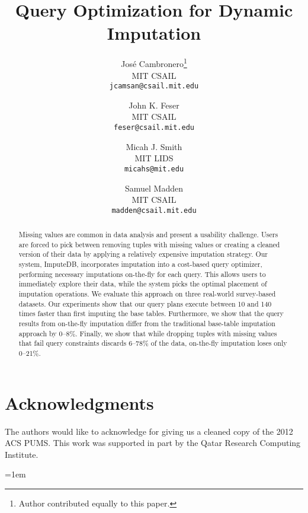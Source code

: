 \documentclass{vldb}
\title{Query Optimization for Dynamic Imputation}
\author{
  Jos\'e Cambronero\thanks{Author contributed equally to this paper.} \\
  MIT CSAIL \\
  \texttt{jcamsan@csail.mit.edu}
  \and
  John K. Feser\footnotemark[1] \\
  MIT CSAIL \\
  \texttt{feser@csail.mit.edu}
  \and
  Micah J. Smith\footnotemark[1] \\
  MIT LIDS \\
  \texttt{micahs@mit.edu}
  \and
  Samuel Madden \\
  MIT CSAIL \\
  \texttt{madden@csail.mit.edu}}
\newcommand{\ProjectName}{ImputeDB\xspace}
\newcommand{\cameraready}[1]{{\color{red}#1}}
\newcommand{\lowxalphazero}{10} %
\newcommand{\highxalphazero}{140} %
\newcommand{\lowsmapealphazero}{0} %
\newcommand{\highsmapealphazero}{8} %
\newcommand{\lowcountfractionlostalphazero}{0}
\newcommand{\highcountfractionlostalphazero}{21}
\newcommand{\lowcountfractionlostalphaone}{6}
\newcommand{\highcountfractionlostalphaone}{78}
\begin{document}
\maketitle

\begin{abstract}
  Missing values are common in data analysis and present a usability challenge.
  Users are forced to pick between removing tuples with missing values or creating a cleaned version of their data by applying a relatively expensive imputation strategy.
  Our system, \ProjectName{}, incorporates imputation into a cost-based query optimizer, performing necessary imputations on-the-fly for each query.
  This allows users to immediately explore their data, while the system picks the optimal placement of imputation operations.
  We evaluate this approach on three real-world survey-based datasets.
  Our experiments show that our query plans execute between \lowxalphazero{} and \highxalphazero{} times faster than first imputing the base tables.
  Furthermore, we show that the query results from on-the-fly imputation differ from the
  traditional base-table imputation approach by \lowsmapealphazero{}--\cameraready{\highsmapealphazero{}\%}.
  Finally, we show that while dropping tuples with missing values that fail query constraints discards \lowcountfractionlostalphaone--\highcountfractionlostalphaone\% of the data, on-the-fly imputation loses only \lowcountfractionlostalphazero--\highcountfractionlostalphazero\%.
\end{abstract}









\section{Acknowledgments}
The authors would like to acknowledge \citeauthor{akande2015empirical} for giving us a cleaned copy of the 2012 ACS PUMS.
This work was supported in part by the Qatar Research Computing Institute.

\emergencystretch=1em
\printbibliography
\balance
\end{document}

